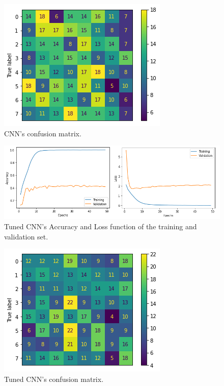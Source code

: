 \begin{figure}[ht]
\centering
\includegraphics[scale=0.6]{images/2021-confusion_matrix.png}
\caption{CNN's confusion matrix.}
\label{fig:cf_2021}
\end{figure}

\begin{figure}[ht]
\centering
\includegraphics[scale=0.6]{images/tuned-val-train.png}
\caption{Tuned CNN's Accuracy and Loss function of the training and validation set.}
\label{fig:Acc_Loss_tuned}
\end{figure}

\begin{figure}[ht]
\centering
\includegraphics[scale=0.6]{images/tuned-confusion_matrix.png}
\caption{Tuned CNN's confusion matrix.}
\label{fig:cf_tuned}
\end{figure}

